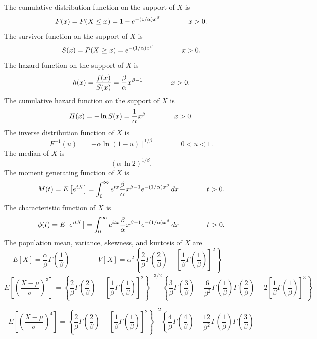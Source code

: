 \documentclass[12pt,fullpage]{article}
\begin{document}
\noindent
The cumulative distribution function on
the support of $X$ is
$$
F(x) = P(X \le x) = 1 -  e ^ {- (1 /\alpha) x^ {\kern 0.04em \beta}} \qquad \qquad x > 0.
$$
The survivor function on the support of $X$ is
$$
S(x) = P(X \ge x) = e ^ {- (1 /\alpha) x^{\kern 0.04em \beta}} \qquad \qquad x > 0.
$$
The hazard function on the support of $X$ is
$$
h(x) = \frac{f(x)}{S(x)} = \frac{\beta}{\alpha} \kern 0.04em  x ^ {\kern 0.04em \beta-1} \qquad \qquad x > 0.
$$
The cumulative hazard function on the support of $X$ is
$$
H(x) = - \ln S(x) = \frac{1}{\alpha} \kern 0.04em  x ^ {\kern 0.04em \beta} \qquad \qquad x > 0.
$$
The inverse distribution function of $X$ is
$$
F ^ {-1}(u) = \left[ - \alpha \ln (1 - u) \right] ^ {1 / \beta} \qquad \qquad 0 < u < 1.
$$
The median of $X$ is
$$
(\alpha \, \ln 2)^{1 / \beta}.
$$
The moment generating function of $X$ is
$$
M(t) = E\left[ e ^ {\kern 0.04em tX} \right] =
\displaystyle \int_0 ^\infty e^{tx}
\frac{\beta}{\alpha} \kern 0.04em x ^ {\kern 0.04em \beta - 1}
e ^ {- (1/ \alpha) x ^ {\kern 0.04em \beta}}
\, dx \qquad \qquad t > 0.
$$
The characteristic function of $X$ is
$$
\phi(t) = E\left[ e ^ {itX} \right] = \displaystyle \int_0 ^\infty e^{itx} \frac{\beta}{\alpha} \kern 0.04em x ^ {\kern 0.04em \beta - 1} e ^ {- (1/ \alpha) x ^ {\kern 0.04em \beta}} \, dx \qquad \qquad t > 0.
$$
The population mean, variance, skewness, and kurtosis of $X$ are
$$
E[X] = \frac{\alpha}{\beta} \Gamma \left( \frac{1}{\beta} \right) \qquad \qquad 
V[X] = \alpha^2 \left\{ \frac{2}{\beta} \Gamma \left( \frac{2}{\beta} \right) - \left[ \frac{1}{\beta} \Gamma \left( \frac{1}{\beta} \right) \right]^2 \right\} \qquad \qquad 
$$
$$
E\left[ \left( \frac{X - \mu}{\sigma} \right) ^ 3 \right] = \left\{ \frac{2}{\beta} \Gamma \left( \frac{2}{\beta} \right) - \left[ \frac{1}{\beta} \Gamma \left( \frac{1}{\beta} \right) \right]^2 \right\}^{-3/2} \left\{ \frac{3}{\beta} \Gamma \left( \frac{3}{\beta} \right) - \frac{6}{\beta^2} \Gamma \left( \frac{1}{\beta} \right) \Gamma \left( \frac{2}{\beta} \right) + 2 \left[ \frac{1}{\beta} \Gamma \left( \frac{1}{\beta} \right) \right]^3 \right\}
$$
\begin{small}
$$
E\left[ \left( \frac{X - \mu}{\sigma} \right) ^ 4 \right] = \left\{ \frac{2}{\beta} \Gamma \left( \frac{2}{\beta} \right) - \left[ \frac{1}{\beta} \Gamma \left( \frac{1}{\beta} \right) \right]^2 \right\}^{-2} \left\{ \frac{4}{\beta} \Gamma \left( \frac{4}{\beta} \right) - \frac{12}{\beta^2} \Gamma \left( \frac{1}{\beta} \right) \Gamma \left( \frac{3}{\beta} \right) \right.
$$
\end{small}
\end{document}
